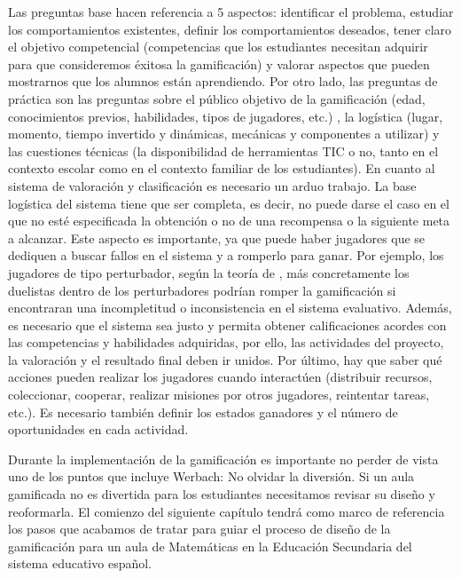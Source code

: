 Las preguntas base hacen referencia a 5 aspectos: identificar el problema, estudiar los comportamientos existentes, definir los comportamientos deseados, tener claro el objetivo competencial (competencias que los estudiantes necesitan adquirir para que consideremos éxitosa la gamificación) y valorar aspectos que pueden mostrarnos que los alumnos están aprendiendo.
%
Por otro lado, las preguntas de práctica son las preguntas sobre el público objetivo de la gamificación (edad, conocimientos previos, habilidades, tipos de jugadores, etc.) , la logística (lugar, momento, tiempo invertido y dinámicas, mecánicas y componentes a utilizar) y las cuestiones técnicas (la disponibilidad de herramientas TIC o no, tanto en el contexto escolar como en el contexto familiar de los estudiantes).
%
En cuanto al sistema de valoración y clasificación es necesario un arduo trabajo.
%
La base logística del sistema tiene que ser completa, es decir, no puede darse el caso en el que no esté especificada la obtención o no de una recompensa o la siguiente meta a alcanzar.
%
Este aspecto es importante, ya que puede haber jugadores que se dediquen a buscar fallos en el sistema y a romperlo para ganar.
%
Por ejemplo, los jugadores de tipo perturbador, según la teoría de  \citet{marczewski}, más concretamente los duelistas dentro de los perturbadores podrían romper la gamificación si encontraran una incompletitud o inconsistencia en el sistema evaluativo.
%
Además, es necesario que el sistema sea justo y permita obtener calificaciones acordes con las competencias y habilidades adquiridas, por ello, las actividades del proyecto, la valoración y el resultado final deben ir unidos.
%
Por último, hay que saber qué acciones pueden realizar los jugadores cuando interactúen (distribuir recursos, coleccionar, cooperar, realizar misiones por otros jugadores, reintentar tareas, etc.). 
%
Es necesario también definir los estados ganadores y el número de oportunidades en cada actividad.

Durante la implementación de la gamificación es importante no perder de vista uno de los puntos que incluye Werbach: No olvidar la diversión.
%
Si un aula gamificada no es divertida para los estudiantes necesitamos revisar su diseño y reoformarla.
%
El comienzo del siguiente capítulo tendrá como marco de referencia los pasos que acabamos de tratar para guiar el proceso de diseño de la gamificación para un aula de Matemáticas en la Educación Secundaria del sistema educativo español.


